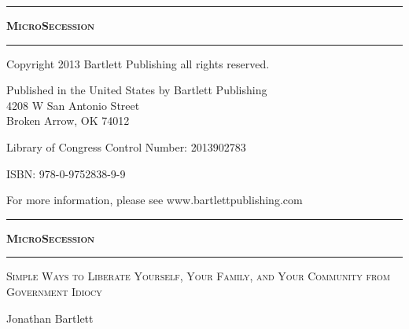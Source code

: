 \begin{titlepage}
\begin{center}

\vspace*{\fill}
\hrule
{\LARGE \textsc{\textbf{MicroSecession}}}
\baselineskip
\hrule
\vspace*{\fill}

\clearpage

\vspace*{\fill}

{\small
Copyright 2013 Bartlett Publishing all rights reserved.

Published in the United States by Bartlett Publishing\\
4208 W San Antonio Street\\
Broken Arrow, OK 74012

Library of Congress Control Number: 2013902783

ISBN: 978-0-9752838-9-9

For more information, please see www.bartlettpublishing.com
}
\vspace*{\fill}

\clearpage

\vspace*{\fill}
\hrule
{\LARGE \textsc{\textbf{MicroSecession}}}
\baselineskip
\hrule
{}\baselineskip
{\Large \textsc{Simple Ways to Liberate Yourself, Your Family, and Your Community from Government Idiocy}}

\baselineskip

{\Large Jonathan Bartlett}

\baselineskip


\vspace*{\fill}

\end{center}
\end{titlepage}

